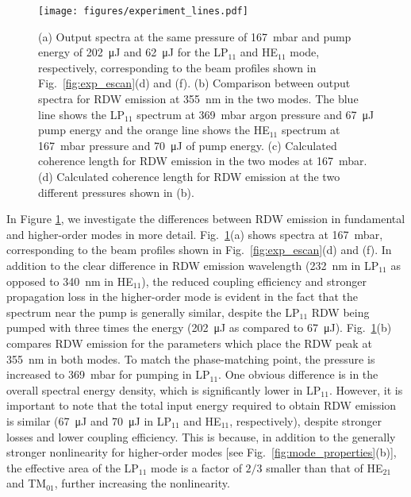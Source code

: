 \documentclass[amsmath, preprint, floatfix]{revtex4-2}
\begin{document}
\begin{figure}
    \centering
    \texttt{[image: figures/experiment\_lines.pdf]}
    \caption{(a) Output spectra at the same pressure of \SI{167}{\milli\bar} and pump energy of \SI{202}{\micro\joule} and \SI{62}{\micro\joule} for the LP$_{11}$ and HE$_{11}$ mode, respectively, corresponding to the beam profiles shown in Fig.~\ref{fig:exp_escan}(d) and (f). (b) Comparison between output spectra for RDW emission at \SI{355}{\nm} in the two modes. The blue line shows the LP$_{11}$ spectrum at \SI{369}{\milli\bar} argon pressure and \SI{67}{\micro\joule} pump energy and the orange line shows the HE$_{11}$ spectrum at \SI{167}{\milli\bar} pressure and \SI{70}{\micro\joule} of pump energy. (c) Calculated coherence length for RDW emission in the two modes at \SI{167}{\milli\bar}. (d) Calculated coherence length for RDW emission at the two different pressures shown in (b).}
    \label{fig:exp_lines}
\end{figure}

In Figure \ref{fig:exp_lines}, we investigate the differences between RDW emission in fundamental and higher-order modes in more detail. Fig.~\ref{fig:exp_lines}(a) shows spectra at \SI{167}{\milli\bar}, corresponding to the beam profiles shown in Fig.~\ref{fig:exp_escan}(d) and (f). In addition to the clear difference in RDW emission wavelength (\SI{232}{\nm} in LP$_{11}$ as opposed to \SI{340}{\nm} in HE$_{11}$), the reduced coupling efficiency and stronger propagation loss in the higher-order mode is evident in the fact that the spectrum near the pump is generally similar, despite the LP$_{11}$ RDW being pumped with three times the energy (\SI{202}{\micro\joule} as compared to \SI{67}{\micro\joule}). Fig.~\ref{fig:exp_lines}(b) compares RDW emission for the parameters which place the RDW peak at \SI{355}{\nm} in both modes. To match the phase-matching point, the pressure is increased to \SI{369}{\milli\bar} for pumping in LP$_{11}$. One obvious difference is in the overall spectral energy density, which is significantly lower in LP$_{11}$. However, it is important to note that the total input energy required to obtain RDW emission is similar (\SI{67}{\micro\joule} and \SI{70}{\micro\joule} in LP$_{11}$ and HE$_{11}$, respectively), despite stronger losses and lower coupling efficiency. This is because, in addition to the generally stronger nonlinearity for higher-order modes [see Fig.~\ref{fig:mode_properties}(b)], the effective area of the LP$_{11}$ mode is a factor of $2/3$ smaller than that of HE$_{21}$ and TM$_{01}$, further increasing the nonlinearity.
\end{document}
